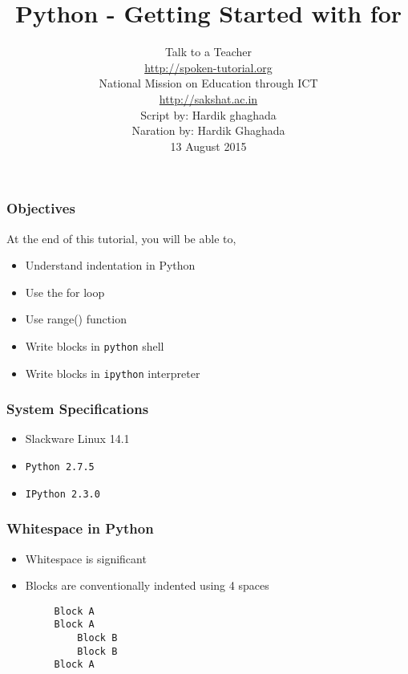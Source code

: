 \documentclass[17pt,compress]{beamer}
\author[FOSSEE]{}
\institute[IIT Bombay]{}
\date[]{}
\begin{document}
\sffamily \bfseries
\title
[Getting Started with for]
{Python - Getting Started with for}
\author
[FOSSEE, IIT - Bombay]
{\small Talk to a Teacher\\{\color{blue}\url{http://spoken-tutorial.org}}\\National Mission on Education
 through ICT\\{\color{blue}\url{http://sakshat.ac.in}} \\[0.5cm]{\tiny Script by: Hardik ghaghada \\ Naration by: Hardik Ghaghada \\ 13 August 2015}}

\begin{frame}
   \titlepage
\end{frame}
\begin{frame}
\frametitle{Objectives}
  At the end of this tutorial, you will be able to, \pause
\begin{itemize}
\item Understand indentation in Python\pause
\item Use the for loop\pause
\item Use range() function\pause
\item Write blocks in \texttt{python} shell\pause
\item Write blocks in \texttt{ipython} interpreter
\end{itemize}
\end{frame}
\begin{frame}
\frametitle{System Specifications}\pause
\begin{itemize}
\item Slackware Linux 14.1\pause
\item \texttt{Python 2.7.5} \pause
\item \texttt{IPython 2.3.0}
\end{itemize}
\end{frame}
\begin{frame}[fragile]
\frametitle{Whitespace in Python}
\begin{itemize}
\item Whitespace is significant\pause
\item Blocks are conventionally indented using 4 spaces\pause
\begin{verbatim}
     Block A
     Block A
         Block B
         Block B
     Block A
\end{verbatim}
\end{itemize}
\end{frame}
\end{document}
